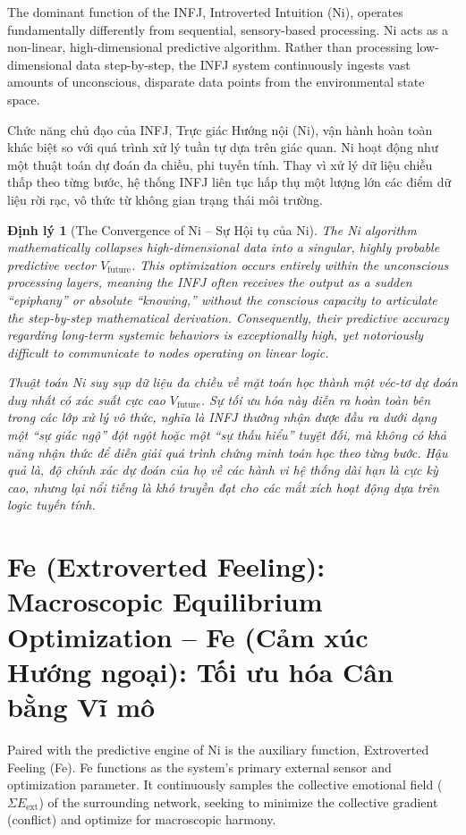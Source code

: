 \documentclass{report}
\newtheorem{dinhly}{Định lý}
\begin{document}
The dominant function of the INFJ, Introverted Intuition (Ni), operates fundamentally differently from sequential, sensory-based processing. Ni acts as a non-linear, high-dimensional predictive algorithm. Rather than processing low-dimensional data step-by-step, the INFJ system continuously ingests vast amounts of unconscious, disparate data points from the environmental state space. 

Chức năng chủ đạo của INFJ, Trực giác Hướng nội (Ni), vận hành hoàn toàn khác biệt so với quá trình xử lý tuần tự dựa trên giác quan. Ni hoạt động như một thuật toán dự đoán đa chiều, phi tuyến tính. Thay vì xử lý dữ liệu chiều thấp theo từng bước, hệ thống INFJ liên tục hấp thụ một lượng lớn các điểm dữ liệu rời rạc, vô thức từ không gian trạng thái môi trường.

\begin{dinhly}[The Convergence of Ni -- Sự Hội tụ của Ni]
	The Ni algorithm mathematically collapses high-dimensional data into a singular, highly probable predictive vector $V_{\text{future}}$. This optimization occurs entirely within the unconscious processing layers, meaning the INFJ often receives the output as a sudden ``epiphany'' or absolute ``knowing,'' without the conscious capacity to articulate the step-by-step mathematical derivation. Consequently, their predictive accuracy regarding long-term systemic behaviors is exceptionally high, yet notoriously difficult to communicate to nodes operating on linear logic.
	
	Thuật toán Ni suy sụp dữ liệu đa chiều về mặt toán học thành một véc-tơ dự đoán duy nhất có xác suất cực cao $V_{\text{future}}$. Sự tối ưu hóa này diễn ra hoàn toàn bên trong các lớp xử lý vô thức, nghĩa là INFJ thường nhận được đầu ra dưới dạng một ``sự giác ngộ'' đột ngột hoặc một ``sự thấu hiểu'' tuyệt đối, mà không có khả năng nhận thức để diễn giải quá trình chứng minh toán học theo từng bước. Hậu quả là, độ chính xác dự đoán của họ về các hành vi hệ thống dài hạn là cực kỳ cao, nhưng lại nổi tiếng là khó truyền đạt cho các mắt xích hoạt động dựa trên logic tuyến tính.
\end{dinhly}

\section{Fe (Extroverted Feeling): Macroscopic Equilibrium Optimization -- Fe (Cảm xúc Hướng ngoại): Tối ưu hóa Cân bằng Vĩ mô}

Paired with the predictive engine of Ni is the auxiliary function, Extroverted Feeling (Fe). Fe functions as the system's primary external sensor and optimization parameter. It continuously samples the collective emotional field ($\Sigma E_{\text{ext}}$) of the surrounding network, seeking to minimize the collective gradient (conflict) and optimize for macroscopic harmony.
\end{document}
